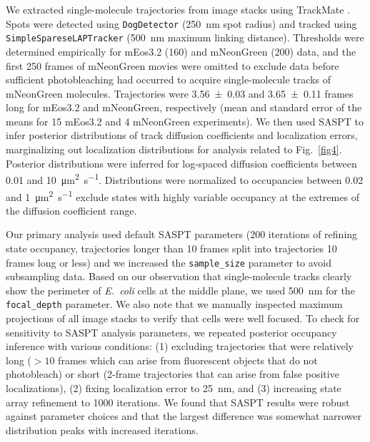 \documentclass[twocolumn,pdflatex,sn-nature]{sn-jnl}%
\newcommand\ec{\textit{E.~coli}}
\begin{document}
We extracted single-molecule trajectories from image stacks using TrackMate \citep{tinevezTrackMateOpenExtensible2017}. Spots were detected using \verb|DogDetector| (\qty{250}{\nm} spot radius) and tracked using \verb|SimpleSpareseLAPTracker| (\qty{500}{\nm} maximum linking distance).
Thresholds were determined empirically for mEos3.2 (160) and mNeonGreen (200) data, and the first 250 frames of mNeonGreen movies were omitted to exclude data before sufficient photobleaching had occurred to acquire single-molecule tracks of mNeonGreen molecules.
Trajectories were \num{3.56 +- 0.03} and \num{3.65 +- 0.11} frames long for mEos3.2 and mNeonGreen, respectively (mean and standard error of the means for 15 mEos3.2 and 4 mNeonGreen experiments).
We then used SASPT \citep{heckertRecoveringMixturesFastdiffusing2022a} to infer posterior distributions of track diffusion coefficients and localization errors, marginalizing out localization distributions for analysis related to Fig.~\ref{fig4}.
Posterior distributions were inferred for log-spaced diffusion coefficients between \num{0.01} and \qty{10}{\square\um\per\s}.
Distributions were normalized to occupancies between \num{0.02} and \qty{1}{\square\um\per\s} exclude states with highly variable occupancy at the extremes of the diffusion coefficient range.

Our primary analysis used default SASPT parameters (200 iterations of refining state occupancy, trajectories longer than 10 frames split into trajectories 10 frames long or less) and we increased the \verb|sample_size| parameter to avoid subsampling data.
Based on our observation that single-molecule tracks clearly show the perimeter of \ec{} cells at the middle plane, we used \qty{500}{\nm} for the \verb|focal_depth| parameter.
We also note that we manually inspected maximum projections of all image stacks to verify that cells were well focused.
To check for sensitivity to SASPT analysis parameters, we repeated posterior occupancy inference with various conditions: (1) excluding trajectories that were relatively long ($>10$ frames which can arise from fluorescent objects that do not photobleach) or short (2-frame trajectories that can arise from false positive localizations), (2) fixing localization error to \qty{25}{\nm}, and (3) increasing state array refinement to \num{1000} iterations.
We found that SASPT results were robust against parameter choices and that the largest difference was somewhat narrower distribution peaks with increased iterations.

\backmatter
\end{document}
